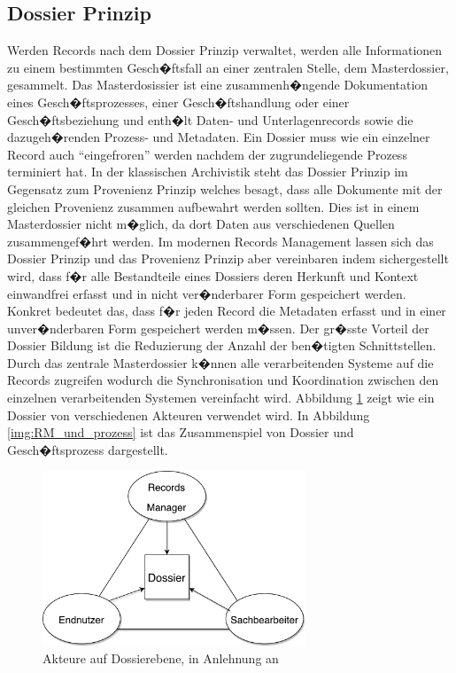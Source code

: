 \documentclass[a4paper,twoside,10pt]{report}
\begin{document}
\subsection{Dossier Prinzip}\label{dossier}
Werden Records nach dem Dossier Prinzip verwaltet, werden alle Informationen zu einem bestimmten Gesch�ftsfall an einer zentralen Stelle, dem Masterdossier, gesammelt. Das Masterdosissier ist eine zusammenh�ngende Dokumentation eines Gesch�ftsprozesses, einer Gesch�ftshandlung oder einer Gesch�ftsbeziehung und enth�lt Daten- und Unterlagenrecords sowie die dazugeh�renden Prozess- und Metadaten. Ein Dossier muss wie ein einzelner Record auch "`eingefroren"' werden nachdem der zugrundeliegende Prozess terminiert hat. In der klassischen Archivistik steht das Dossier Prinzip im Gegensatz zum Provenienz Prinzip welches besagt, dass alle Dokumente mit der gleichen Provenienz zusammen aufbewahrt werden sollten. Dies ist in einem Masterdossier nicht m�glich, da dort Daten aus verschiedenen Quellen zusammengef�hrt werden. Im modernen Records Management lassen sich das Dossier Prinzip und das Provenienz Prinzip aber vereinbaren indem sichergestellt wird, dass f�r alle Bestandteile eines Dossiers deren Herkunft und Kontext einwandfrei erfasst und in nicht ver�nderbarer Form gespeichert werden. Konkret bedeutet das, dass f�r jeden Record die Metadaten erfasst und in einer unver�nderbaren Form gespeichert werden m�ssen. Der gr�sste Vorteil der Dossier Bildung ist die Reduzierung der Anzahl der ben�tigten Schnittstellen. Durch das zentrale Masterdossier k�nnen alle verarbeitenden Systeme auf die Records zugreifen wodurch die Synchronisation und Koordination zwischen den einzelnen verarbeitenden Systemen vereinfacht wird. Abbildung \ref{img:dossierakt} zeigt wie ein Dossier von verschiedenen Akteuren verwendet wird. In Abbildung \ref{img:RM_und_prozess} ist das Zusammenspiel von Dossier und Gesch�ftsprozess dargestellt. \cite{rmGest}

\begin{figure}[htb]%
\centering
\includegraphics[width=0.7\textwidth]{dossierakteure.pdf}%
\caption{Akteure auf Dossierebene, in Anlehnung an \cite{rmGest}}%
\label{img:dossierakt}%
\end{figure}
\end{document}
